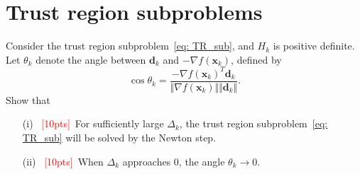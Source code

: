 \documentclass[10pt]{article}
\begin{document}
\section{Trust region subproblems}
Consider the trust region subproblem~\eqref{eq: TR_sub}, and $H_k$ is positive definite. Let $\theta_{k}$ denote the angle between $\bm{d}_{k}$ and $-\nabla f(\bm{x}_{k})$, defined by 
$$\cos\theta_{k} = \frac{-\nabla f(\bm{x}_{k})^{T}\bm{d}_{k}}{\Vert\nabla f(\bm{x}_{k})\Vert\Vert\bm{d}_{k}\Vert}.$$Show that
\begin{itemize}
	\item[(i)] ~\textcolor{red}{[10pts]}~For sufficiently large $\Delta_{k}$, the trust region subproblem~\eqref{eq: TR_sub} will be solved by the Newton step.
	
	\item[(ii)] ~\textcolor{red}{[10pts]}~When $\Delta_{k}$ approaches $0$, the angle $\theta_{k}\to 0$.
\end{itemize}
\end{document}
